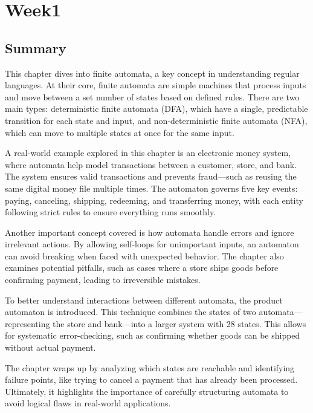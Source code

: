 \documentclass{article}
\title
\author{}
\date{}
\begin{document}
\maketitle
\section{Week1}
\subsection{Summary}
This chapter dives into finite automata, a key concept in understanding regular languages. At their core, finite automata are simple machines that process inputs and move between a set number of states based on defined rules. There are two main types: deterministic finite automata (DFA), which have a single, predictable transition for each state and input, and non-deterministic finite automata (NFA), which can move to multiple states at once for the same input. 

A real-world example explored in this chapter is an electronic money system, where automata help model transactions between a customer, store, and bank. The system ensures valid transactions and prevents fraud—such as reusing the same digital money file multiple times. The automaton governs five key events: paying, canceling, shipping, redeeming, and transferring money, with each entity following strict rules to ensure everything runs smoothly.

Another important concept covered is how automata handle errors and ignore irrelevant actions. By allowing self-loops for unimportant inputs, an automaton can avoid breaking when faced with unexpected behavior. The chapter also examines potential pitfalls, such as cases where a store ships goods before confirming payment, leading to irreversible mistakes. 

To better understand interactions between different automata, the product automaton is introduced. This technique combines the states of two automata—representing the store and bank—into a larger system with 28 states. This allows for systematic error-checking, such as confirming whether goods can be shipped without actual payment.

The chapter wraps up by analyzing which states are reachable and identifying failure points, like trying to cancel a payment that has already been processed. Ultimately, it highlights the importance of carefully structuring automata to avoid logical flaws in real-world applications.
\end{document}
